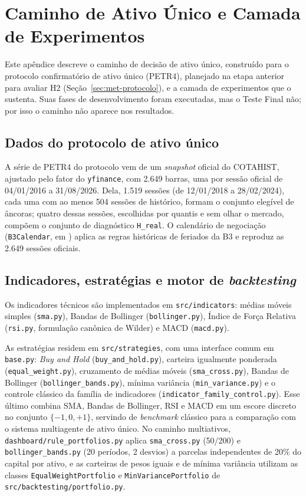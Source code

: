 \chapter{Caminho de Ativo Único e Camada de Experimentos}
\label{ap:ativo-unico}

Este apêndice descreve o caminho de decisão de ativo único, construído para o protocolo confirmatório de ativo único (PETR4), planejado na etapa anterior para avaliar H2 (Seção~\ref{sec:met-protocolo}), e a camada de experimentos que o sustenta. Suas fases de desenvolvimento foram executadas, mas o Teste Final não; por isso o caminho não aparece nos resultados.

\section{Dados do protocolo de ativo único}

A série de PETR4 do protocolo vem de um \textit{snapshot} oficial do COTAHIST, ajustado pelo fator do \texttt{yfinance}, com 2.649 barras, uma por sessão oficial de 04/01/2016 a 31/08/2026. Dela, 1.519 sessões (de 12/01/2018 a 28/02/2024), cada uma com ao menos 504 sessões de histórico, formam o conjunto elegível de âncoras; quatro dessas sessões, escolhidas por quantis e sem olhar o mercado, compõem o conjunto de diagnóstico \texttt{H\_real}. O calendário de negociação (\texttt{B3Calendar}, em ) aplica as regras históricas de feriados da B3 e reproduz as 2.649 sessões oficiais.

\section{Indicadores, estratégias e motor de \textit{backtesting}}

Os indicadores técnicos são implementados em \texttt{src/indicators}: médias móveis simples (\texttt{sma.py}), Bandas de Bollinger (\texttt{bollinger.py}), Índice de Força Relativa (\texttt{rsi.py}, formulação canônica de Wilder) e MACD (\texttt{macd.py}).

As estratégias residem em \texttt{src/strategies}, com uma interface comum em \texttt{base.py}: \textit{Buy and Hold} (\texttt{buy\_and\_hold.py}), carteira igualmente ponderada (\texttt{equal\_weight.py}), cruzamento de médias móveis (\texttt{sma\_cross.py}), Bandas de Bollinger (\texttt{bollinger\_bands.py}), mínima variância (\texttt{min\_variance.py}) e o controle clássico da família de indicadores (\texttt{indicator\_family\_control.py}). Esse último combina SMA, Bandas de Bollinger, RSI e MACD em um escore discreto no conjunto $\{-1, 0, +1\}$, servindo de \textit{benchmark} clássico para a comparação com o sistema multiagente de ativo único. No caminho multiativos, \texttt{dashboard/rule\_portfolios.py} aplica \texttt{sma\_cross.py} (50/200) e \texttt{bollinger\_bands.py} (20 períodos, 2 desvios) a parcelas independentes de 20\% do capital por ativo, e as carteiras de pesos iguais e de mínima variância utilizam as classes \texttt{EqualWeightPortfolio} e \texttt{MinVariancePortfolio} de \texttt{src/backtesting/portfolio.py}.


